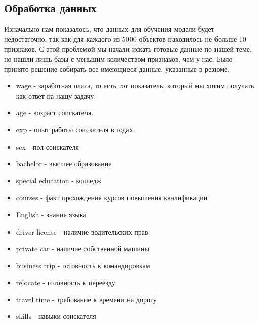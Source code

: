 \documentclass{article}
\begin{document}
\subsection{Обработка данных}
Изначально нам показалось, что данных для обучения модели будет недостаточно, так как для каждого из 5000 объектов находилось не больше 10 признаков. С этой проблемой мы начали искать готовые данные по нашей теме, но нашли лишь базы с меньшим количеством признаков, чем у нас. 
Было принято решение собирать все имеющиеся данные, указанные в резюме. 

\begin{itemize}
  \color{red}
  \item \color{black} wage - заработная плата, то есть тот показатель, который мы хотим получать как ответ на нашу задачу.
  \color{red}
  \item \color{black} age - возраст соискателя. 
  \color{red}
  \item \color{black} exp - опыт работы соискателя в годах.
  \color{red}
  \item \color{black} sex - пол соискателя 
  \color{red}
  \item \color{black} bachelor - высшее образование
  \color{red}
  \item \color{black} special education - колледж
  \color{red}
  \item \color{black} courses - факт прохождения курсов повышения квалификации
  \color{red}
  \item \color{black} English - знание языка 
  \color{red}
  \item \color{black} driver license - наличие водительских прав
  \color{red}
  \item \color{black} private car - наличие собственной машины
  \color{red}
  \item \color{black} business trip - готовность к командировкам
  \color{red}
  \item \color{black} relocate - готовность к переезду
  \color{red}
  \item \color{black} travel time - требование к времени на дорогу
  \color{red}
  \item \color{black} skills - навыки соискателя

\end{itemize}
\color{black}
\end{document}
